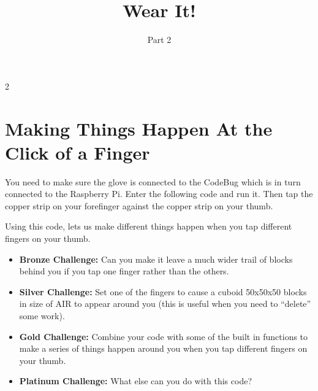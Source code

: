 \documentclass{geocraft-worksheet-multipage}
\begin{document}
\title{Wear It!}
\subtitle{Part 2}

\date{}

\maketitle

\setcounter {section} {2}


\section{Making Things Happen At the Click of a Finger}
\lstset{language=Python}

You need to make sure the glove is connected to the CodeBug which is in turn connected to the Raspberry Pi. Enter the
following code and run it. Then tap the copper strip on your forefinger against the copper strip on your thumb.



\noindent%
%
\vspace{0.2cm}
%
%

\noindent Using this code, lets us make different things happen when you tap different fingers on your thumb.

\begin{itemize}
\item\textbf{Bronze Challenge:} Can you make it leave a much wider trail of blocks behind you if you tap one finger
  rather than the others.

\item\textbf{Silver Challenge:} Set one of the fingers to cause a cuboid 50x50x50 blocks in size of AIR to appear around
  you (this is useful when you need to ``delete'' some work).

\item\textbf{Gold Challenge:} Combine your code with some of the built in functions to make a series of things happen
  around you when you tap different fingers on your thumb. 

\item\textbf{Platinum Challenge:} What else can you do with this code?

\end{itemize}
\end{document}
